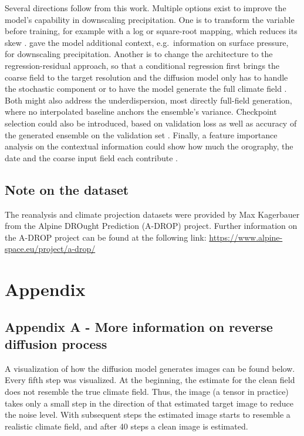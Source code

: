 \documentclass[
]{krantz}
\begin{document}
Several directions follow from this work. Multiple options exist to improve the model's capability in downscaling precipitation. One is to transform the variable before training, for example with a log or square-root mapping, which reduces its skew \citep{addison2026, aich2026}.
\citet{lopezgomez2025} gave the model additional context, e.g.~information on surface pressure, for downscaling precipitation.
Another is to change the architecture to the regression-residual approach, so that a conditional regression first brings the coarse field to the target resolution and the diffusion model only has to handle the stochastic component \citep{mardani2025, tomasi2025} or to have the model generate the full climate field \citep{addison2026, aich2026}.
Both might also address the underdispersion, most directly full-field generation, where no interpolated baseline anchors the ensemble's variance.
Checkpoint selection could also be introduced, based on validation loss as well as accuracy of the generated ensemble on the validation set \citep{addison2026}.
Finally, a feature importance analysis on the contextual information could show how much the orography, the date and the coarse input field each contribute \citep{lopezgomez2025}.

\subsection{Note on the dataset}\label{note-on-the-dataset}

The reanalysis and climate projection datasets were provided by Max Kagerbauer from the Alpine DROught Prediction (A-DROP) project.
Further information on the A-DROP project can be found at the following link: \url{https://www.alpine-space.eu/project/a-drop/}

\section{Appendix}\label{appendix}

\subsection{Appendix A - More information on reverse diffusion process}\label{ddm-appendix-a}

A visualization of how the diffusion model generates images can be found below. Every fifth step was visualized. At the beginning, the estimate for the clean field does not resemble the true climate field.
Thus, the image (a tensor in practice) takes only a small step in the direction of that estimated target image to reduce the noise level. With subsequent steps the estimated image starts to resemble a realistic climate field, and after 40 steps a clean image is estimated.
\end{document}
